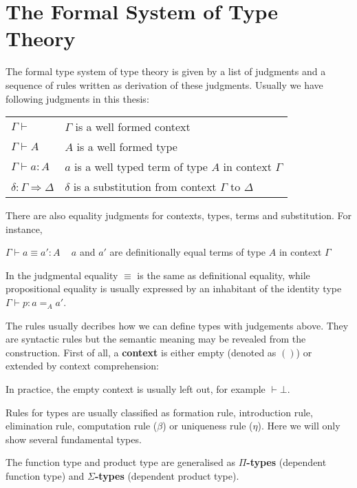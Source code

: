 \section{The Formal System of Type Theory}

The formal type system of type theory is given by a list of judgments and a sequence of rules written as derivation of these judgments. Usually we have following judgments in this thesis:


\begin{tabular}{l l}
$\Gamma \vdash$ & $\Gamma$  is a well formed context \\
$\Gamma \vdash A$ & $A$  is a well formed type \\
$\Gamma \vdash a : A$ & $a$ is a well typed term of type $A$ in context $\Gamma$ \\
$\delta : \Gamma \Rightarrow \Delta$ & $\delta$ is a substitution from context $\Gamma$ to $\Delta$ \\
\end{tabular}

There are also equality judgments for contexts, types, terms and substitution. For instance,

$\Gamma \vdash a \equiv a' : A$  ~ $a$ and $a'$ are definitionally equal terms of type $A$ in context $\Gamma$

In \itt the judgmental equality $\equiv$ is the same as definitional equality, while propositional equality is usually expressed by an inhabitant of the identity type $\Gamma \vdash p: a =_{A} a' $.



The rules usually decribes how we can define types with judgements above. They are syntactic rules but the semantic meaning may be revealed from the construction.
First of all, a \textbf{context} is either empty (denoted as $()$) or extended by context comprehension:


In practice, the empty context is usually left out, for example $\vdash \bot$.



Rules for types are usually classified as formation rule, introduction rule, elimination rule, computation rule ($\beta$) or uniqueness rule ($\eta$). Here we will only show several fundamental types.

The function type and product type are generalised as \textbf{$\Pi$-types} (dependent function type) and \textbf{$\Sigma$-types} (dependent product type).

